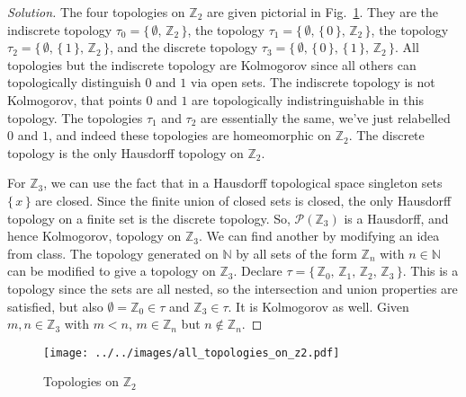 \documentclass{article}
\theoremstyle{normal}
\begin{document}
    \begin{proof}[Solution]
        The four topologies on $\mathbb{Z}_{2}$ are given pictorial in
        Fig.~\ref{fig:all_topologies_on_z2}. They are the indiscrete topology
        $\tau_{0}=\big\{\,\emptyset,\,\mathbb{Z}_{2}\,\big\}$, the topology
        $\tau_{1}=\big\{\,\emptyset,\,\{\,0\,\},\,\mathbb{Z}_{2}\,\big\}$,
        the topology
        $\tau_{2}=\big\{\,\emptyset,\,\{\,1\,\},\,\mathbb{Z}_{2}\,\big\}$,
        and the discrete topology
        $\tau_{3}=\big\{\,\emptyset,\,\{\,0\,\},\,\{\,1\,\},\,\mathbb{Z}_{2}\,\big\}$.
        All topologies but the indiscrete topology are Kolmogorov since all
        others can topologically distinguish $0$ and $1$ via open sets. The
        indiscrete topology is not Kolmogorov, that points $0$ and $1$ are
        topologically indistringuishable in this topology. The topologies
        $\tau_{1}$ and $\tau_{2}$ are essentially the same, we've just
        relabelled $0$ and $1$, and indeed these topologies are homeomorphic
        on $\mathbb{Z}_{2}$. The discrete topology is the only Hausdorff
        topology on $\mathbb{Z}_{2}$.
        \par\hfill\par
        For $\mathbb{Z}_{3}$, we can use the fact that in a Hausdorff
        topological space singleton sets $\{\,x\,\}$ are closed. Since the
        finite union of closed sets is closed, the only Hausdorff topology on
        a finite set is the discrete topology. So,
        $\mathcal{P}(\mathbb{Z}_{3})$ is a Hausdorff, and hence Kolmogorov,
        topology on $\mathbb{Z}_{3}$. We can find another by modifying an
        idea from class. The topology generated on $\mathbb{N}$ by all sets of
        the form $\mathbb{Z}_{n}$ with $n\in\mathbb{N}$ can be modified to
        give a topology on $\mathbb{Z}_{3}$. Declare
        $\tau=\{\,\mathbb{Z}_{0},\,\mathbb{Z}_{1},\,\mathbb{Z}_{2},\,\mathbb{Z}_{3}\,\}$.
        This is a topology since the sets are all nested, so the intersection
        and union properties are satisfied, but also
        $\emptyset=\mathbb{Z}_{0}\in\tau$ and $\mathbb{Z}_{3}\in\tau$. It is
        Kolmogorov as well. Given $m,n\in\mathbb{Z}_{3}$ with
        $m<n$, $m\in\mathbb{Z}_{n}$ but $n\notin\mathbb{Z}_{n}$. 
    \end{proof}
    \begin{figure}
        \centering
        \texttt{[image: ../../images/all\_topologies\_on\_z2.pdf]}
        \caption{Topologies on $\mathbb{Z}_{2}$}
        \label{fig:all_topologies_on_z2}
    \end{figure}
\end{document}

